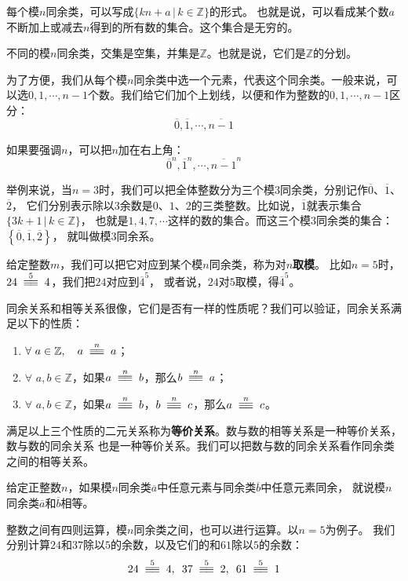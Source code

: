 \documentclass[12pt,UTF8,fontset=none]{ctexbook}
\begin{document}
每个模$n$同余类，可以写成$\{kn + a \, | \, k\in\mathbb{Z} \}$的形式。
也就是说，可以看成某个数$a$不断加上或减去$n$得到的所有数的集合。这个集合是无穷的。

不同的模$n$同余类，交集是空集，并集是$\mathbb{Z}$。也就是说，它们是$\mathbb{Z}$的分划。

为了方便，我们从每个模$n$同余类中选一个元素，代表这个同余类。一般来说，可以选$0,1,\cdots,n-1$个数。我们给它们加个上划线，以便和作为整数的$0,1,\cdots,n-1$区分：
$$\overline{0},\overline{1},\cdots,\overline{n-1}$$

如果要强调$n$，可以把$n$加在右上角：
$$\overline{0}^n,\overline{1}^n,\cdots,\overline{n-1}^n$$

举例来说，当$n=3$时，我们可以把全体整数分为三个模$3$同余类，分别记作$\overline{0}$、$\overline{1}$、$\overline{2}$，
它们分别表示除以$3$余数是$0$、$1$、$2$的三类整数。比如说，$\overline{1}$就表示集合$\{3k + 1 \, | \, k\in\mathbb{Z} \}$，
也就是$1, 4, 7,\cdots$这样的数的集合。而这三个模$3$同余类的集合：$\left\{\overline{0},\overline{1},\overline{2}\right\}$，
就叫做模$3$同余系。

给定整数$m$，我们可以把它对应到某个模$n$同余类，称为对$n$\textbf{取模}。
比如$n=5$时，$24 \tong{5} 4$，我们把$24$对应到$\overline{4}^5$，
或者说，$24$对$5$取模，得$\overline{4}^5$。

同余关系和相等关系很像，它们是否有一样的性质呢？我们可以验证，同余关系满足以下的性质：
\begin{enumerate}
    \item $\forall \,\, a\in \mathbb{Z}, \quad a \tong{n} a$；
    \item $\forall \,\, a, b \in \mathbb{Z}$，如果$a \tong{n} b$，那么$b \tong{n} a$；
    \item $\forall \,\, a, b \in \mathbb{Z}$，如果$a \tong{n} b$，$b \tong{n} c$，那么$a \tong{n} c$。
\end{enumerate}

满足以上三个性质的二元关系称为\textbf{等价关系}。数与数的相等关系是一种等价关系，数与数的同余关系
也是一种等价关系。我们可以把数与数的同余关系看作同余类之间的相等关系。

\begin{df}
    给定正整数$n$，如果模$n$同余类$\overline{a}$中任意元素与同余类$\overline{b}$中任意元素同余，
    就说模$n$同余类$\overline{a}$和$\overline{b}$相等。
\end{df}

整数之间有四则运算，模$n$同余类之间，也可以进行运算。以$n=5$为例子。
我们分别计算$24$和$37$除以$5$的余数，以及它们的和$61$除以$5$的余数：
$$ 24 \tong{5} 4, \,\,\, 37 \tong{5} 2 , \,\,\, 61 \tong{5} 1$$
\end{document}
